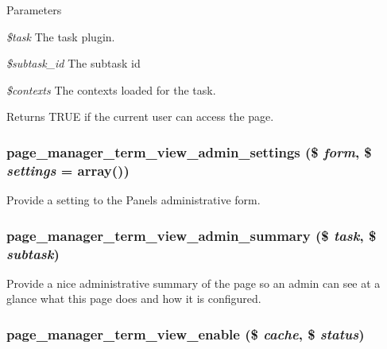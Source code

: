 \begin{DoxyParams}{Parameters}
\item[{\em \$task}]The task plugin. \item[{\em \$subtask\_\-id}]The subtask id \item[{\em \$contexts}]The contexts loaded for the task. \end{DoxyParams}
\begin{DoxyReturn}{Returns}
TRUE if the current user can access the page. 
\end{DoxyReturn}
\hypertarget{term__view_8inc_aea80962afc9da2471d9f4010b30d1929}{
\subsubsection[{page\_\-manager\_\-term\_\-view\_\-admin\_\-settings}]{\setlength{\rightskip}{0pt plus 5cm}page\_\-manager\_\-term\_\-view\_\-admin\_\-settings (\$ {\em form}, \/  \$ {\em settings} = {\ttfamily array()})}}
\label{term__view_8inc_aea80962afc9da2471d9f4010b30d1929}
Provide a setting to the Panels administrative form. \hypertarget{term__view_8inc_acb6720c4d438149b74241ed0be891030}{
\subsubsection[{page\_\-manager\_\-term\_\-view\_\-admin\_\-summary}]{\setlength{\rightskip}{0pt plus 5cm}page\_\-manager\_\-term\_\-view\_\-admin\_\-summary (\$ {\em task}, \/  \$ {\em subtask})}}
\label{term__view_8inc_acb6720c4d438149b74241ed0be891030}
Provide a nice administrative summary of the page so an admin can see at a glance what this page does and how it is configured. \hypertarget{term__view_8inc_abdfd9eee16a69848fbc2945ef9f503b4}{
\subsubsection[{page\_\-manager\_\-term\_\-view\_\-enable}]{\setlength{\rightskip}{0pt plus 5cm}page\_\-manager\_\-term\_\-view\_\-enable (\$ {\em cache}, \/  \$ {\em status})}}
